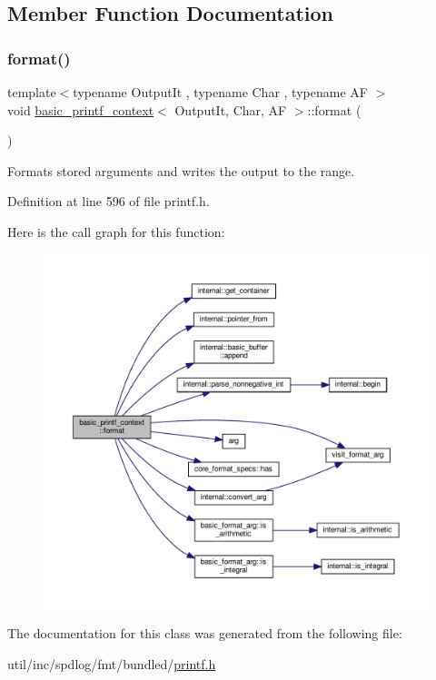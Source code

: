 \subsection{Member Function Documentation}
\mbox{\label{classbasic__printf__context_a1740a3a0a6d2748e4f489fb9b4b9e82c}} 
\subsubsection{\texorpdfstring{format()}{format()}}
{\footnotesize\ttfamily template$<$typename Output\+It , typename Char , typename AF $>$ \\
void \hyperlink{classbasic__printf__context}{basic\+\_\+printf\+\_\+context}$<$ Output\+It, Char, AF $>$\+::format (\begin{DoxyParamCaption}{ }\end{DoxyParamCaption})}

Formats stored arguments and writes the output to the range. 

Definition at line 596 of file printf.\+h.

Here is the call graph for this function\+:
\nopagebreak
\begin{figure}[H]
\begin{center}
\leavevmode
\includegraphics[width=350pt]{classbasic__printf__context_a1740a3a0a6d2748e4f489fb9b4b9e82c_cgraph}
\end{center}
\end{figure}


The documentation for this class was generated from the following file\+:\begin{DoxyCompactItemize}
\item 
util/inc/spdlog/fmt/bundled/\hyperlink{printf_8h}{printf.\+h}\end{DoxyCompactItemize}
